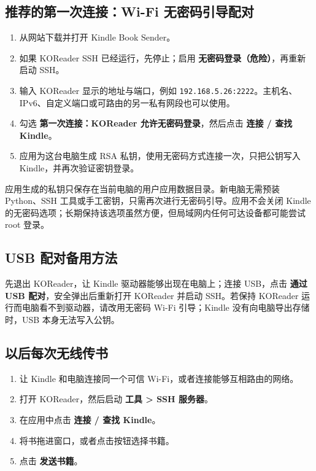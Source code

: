 \documentclass[10pt,a4paper]{article}
\begin{document}
\subsection{推荐的第一次连接：Wi-Fi 无密码引导配对}

\begin{enumerate}
  \item 从网站下载并打开 Kindle Book Sender。
  \item 如果 KOReader SSH 已经运行，先停止；启用 \textbf{无密码登录（危险）}，再重新启动 SSH。
  \item 输入 KOReader 显示的地址与端口，例如 \texttt{192.168.5.26:2222}。主机名、IPv6、自定义端口或可路由的另一私有网段也可以使用。
  \item 勾选 \textbf{第一次连接：KOReader 允许无密码登录}，然后点击 \textbf{连接 / 查找 Kindle}。
  \item 应用为这台电脑生成 RSA 私钥，使用无密码方式连接一次，只把公钥写入 Kindle，并再次验证密钥登录。
\end{enumerate}

应用生成的私钥只保存在当前电脑的用户应用数据目录。新电脑无需预装 Python、SSH 工具或手工密钥，只需再次进行无密码引导。应用不会关闭 Kindle 的无密码选项；长期保持该选项虽然方便，但局域网内任何可达设备都可能尝试 root 登录。

\subsection{USB 配对备用方法}

先退出 KOReader，让 Kindle 驱动器能够出现在电脑上；连接 USB，点击 \textbf{通过 USB 配对}，安全弹出后重新打开 KOReader 并启动 SSH。若保持 KOReader 运行而电脑看不到驱动器，请改用无密码 Wi-Fi 引导；Kindle 没有向电脑导出存储时，USB 本身无法写入公钥。

\subsection{以后每次无线传书}

\begin{enumerate}
  \item 让 Kindle 和电脑连接同一个可信 Wi-Fi，或者连接能够互相路由的网络。
  \item 打开 KOReader，然后启动 \textbf{工具 > SSH 服务器}。
  \item 在应用中点击 \textbf{连接 / 查找 Kindle}。
  \item 将书拖进窗口，或者点击按钮选择书籍。
  \item 点击 \textbf{发送书籍}。
\end{enumerate}
\end{document}
